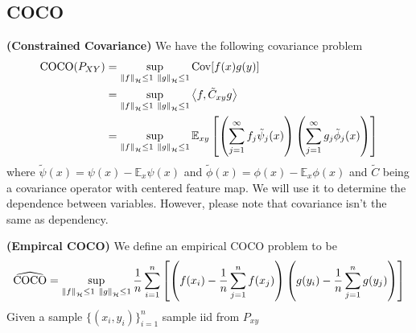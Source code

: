 \subsection{COCO}
\begin{definition}{\textbf{(Constrained Covariance)}}
    We have the following covariance problem 
    \begin{equation*}
    \begin{aligned}
        \operatorname{COCO}(P_{XY}) &= \sup_{\left\lVert f\right\rVert_\mathcal{H} \le 1 \ \left\lVert g\right\rVert_\mathcal{H} \le 1} \operatorname{Cov}[f(x)g(y)] \\
        &= \sup_{\left\lVert f\right\rVert_\mathcal{H} \le 1 \ \left\lVert g\right\rVert_\mathcal{H} \le 1} \left\langle f, \tilde{C}_{xy} g \right\rangle \\
        &= \sup_{\left\lVert f\right\rVert_\mathcal{H} \le 1 \ \left\lVert g\right\rVert_\mathcal{H} \le 1} \mathbb{E}_{xy}\left[ \left( \sum^\infty_{j=1} f_j\tilde{\psi}_j(x)  \right)\left( \sum^\infty_{j=1} g_j\tilde{\phi}_j(x)  \right)  \right] \\
    \end{aligned}
    \end{equation*}
    where $\tilde{\psi}(x) = \psi(x)-\mathbb{E}_x\psi(x)$ and $\tilde{\phi}(x) = \phi(x) - \mathbb{E}_x\phi(x)$
     and $\tilde{C}$ being a covariance operator with centered feature map. We will use it to determine the dependence between variables. However, please note that covariance isn't the same as dependency.
\end{definition}

\begin{definition}{\textbf{(Empircal COCO)}}
    We define an empirical COCO problem to be
    \begin{equation*}
        \widehat{\operatorname{COCO}} = \sup_{\left\lVert f\right\rVert_\mathcal{H} \le 1 \ \left\lVert g\right\rVert_\mathcal{H} \le 1} \frac{1}{n}\sum^n_{i=1}\left[  \left( f(x_i) - \frac{1}{n}\sum^n_{j=1}f(x_j) \right) \left( g(y_i) - \frac{1}{n}\sum^n_{j=1}g(y_j) \right)  \right]
    \end{equation*}
    Given a sample $\{(x_i, y_i)\}^n_{i=1}$ sample iid from $P_{xy}$
\end{definition}

